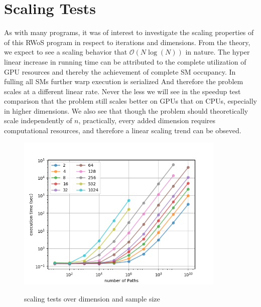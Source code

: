 \section{Scaling Tests}
As with many programs, it was of interest to investigate the scaling properties of
of this \Gls{RWoS} program in respect to iterations and dimensions. From the theory,
we expect to see a scaling behavior that $\mathcal{O}( N\log(N))$ in nature.
The hyper linear increase in running time can be attributed to the complete utilization
of \gls{GPU} resources and thereby the achievement of
complete \gls{SM} occupancy. In fulling all \glspl{SM} further warp execution
is serialized And therefore the problem scales at a different linear rate.  Never the less
we will see in the speedup test comparison that the problem still scales better on \glspl{GPU}
that on \glspl{CPU}, especially in higher dimensions.  We also see that though
the problem should theoretically scale independently of $n$, practically, every
added dimension requires computational resources, and therefore a linear scaling
trend can be obseved.
\begin{figure}[hbt!]
\begin{center}
\includegraphics[width=10.0cm]{styles/scaling} \label{plot:scaling}
  \caption{scaling tests over dimension and sample size}
\end{center}
\end{figure}
